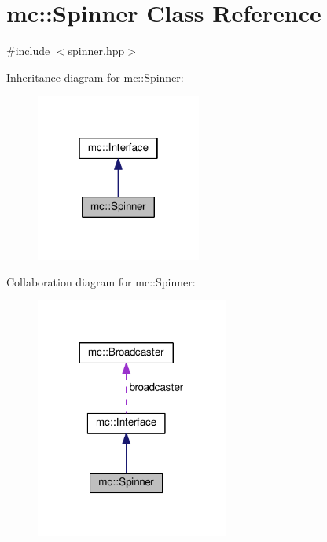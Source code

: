 \hypertarget{classmc_1_1Spinner}{}\section{mc\+:\+:Spinner Class Reference}
\label{classmc_1_1Spinner}


{\ttfamily \#include $<$spinner.\+hpp$>$}



Inheritance diagram for mc\+:\+:Spinner\+:\nopagebreak
\begin{figure}[H]
\begin{center}
\leavevmode
\includegraphics[width=154pt]{classmc_1_1Spinner__inherit__graph}
\end{center}
\end{figure}


Collaboration diagram for mc\+:\+:Spinner\+:\nopagebreak
\begin{figure}[H]
\begin{center}
\leavevmode
\includegraphics[width=180pt]{classmc_1_1Spinner__coll__graph}
\end{center}
\end{figure}
